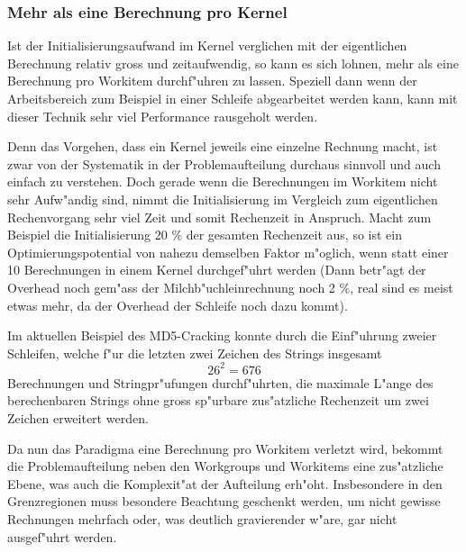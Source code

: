 \begin{refsection}
\subsubsection{Mehr als eine Berechnung pro Kernel}

Ist der Initialisierungsaufwand im Kernel verglichen mit der eigentlichen
Berechnung relativ gross und zeitaufwendig, so kann es sich lohnen, mehr als 
eine Berechnung pro Workitem durchf"uhren zu lassen. Speziell dann wenn der 
Arbeitsbereich zum Beispiel in einer Schleife abgearbeitet werden kann, kann
mit dieser Technik sehr viel Performance rausgeholt werden.

Denn das Vorgehen, dass ein Kernel jeweils eine einzelne Rechnung macht, 
ist zwar von der Systematik in der Problemaufteilung durchaus sinnvoll 
und auch einfach zu verstehen. Doch gerade wenn die Berechnungen im Workitem
nicht sehr Aufw"andig sind, nimmt die Initialisierung im Vergleich zum eigentlichen
Rechenvorgang sehr viel Zeit und somit Rechenzeit in Anspruch. Macht zum Beispiel 
die Initialisierung 20 \% der gesamten Rechenzeit aus, so ist ein 
Optimierungspotential von nahezu demselben Faktor m"oglich, wenn statt einer 10 Berechnungen 
in einem Kernel durchgef"uhrt werden (Dann betr"agt der Overhead noch gem"ass der 
Milchb"uchleinrechnung noch 2 \%, real sind es meist etwas mehr, da der Overhead der 
Schleife noch dazu kommt). 

Im aktuellen Beispiel des MD5-Cracking konnte durch die Einf"uhrung zweier
Schleifen, welche f"ur die letzten zwei Zeichen des Strings insgesamt 
\[ 26^2 = 676 \] Berechnungen und Stringpr"ufungen durchf"uhrten, die 
maximale L"ange des berechenbaren Strings ohne gross sp"urbare zus"atzliche
Rechenzeit um zwei Zeichen erweitert werden.

Da nun das Paradigma eine Berechnung pro Workitem verletzt wird, bekommt
die Problemaufteilung neben den Workgroups und Workitems eine zus"atzliche 
Ebene, was auch die Komplexit"at der Aufteilung erh"oht. Insbesondere in 
den Grenzregionen muss besondere Beachtung geschenkt werden, um nicht
gewisse Rechnungen mehrfach oder, was deutlich gravierender w"are, gar nicht
ausgef"uhrt werden.


\end{refsection}

